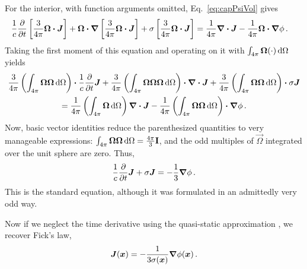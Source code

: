 For the interior, with function arguments omitted, Eq.~\eqref{eq:capPsiVol} gives
\begin{align*}
  \frac{1}{c} \frac{\partial }{\partial t} \left[ \frac{3}{4\pi} \bm{\Omega} \bm{\cdot} \bm{J} \right]
  + \bm{\Omega}\bm{\cdot} \bm{\nabla} \left[ \frac{3}{4\pi} \bm{\Omega} \bm{\cdot} \bm{J} \right]
  + \sigma \left[ \frac{3}{4\pi} \bm{\Omega} \bm{\cdot} \bm{J} \right]
  &= \frac{1}{4\pi} \bm{\nabla} \bm{\cdot}\bm{J}
  - \frac{1}{4\pi} \bm{\Omega}\bm{\cdot} \bm{\nabla} \phi\,.
\end{align*}
Taking the first moment of this equation and operating on it with $\int_{4\pi}
\bm{\Omega}(\cdot) \mathop{}\!\mathrm{d}\Omega$ yields
\begin{multline*}
\frac{3}{4\pi} \left( \int_{4\pi} \bm{\Omega}\bm{\Omega}\mathop{}\!\mathrm{d}\Omega \right) \bm{\cdot}
\frac{1}{c} \frac{\partial }{\partial t} \bm{J}
+ \frac{3}{4\pi} \left( \int_{4\pi}
  \bm{\Omega}\bm{\Omega}\bm{\Omega}\mathop{}\!\mathrm{d}\Omega \right)
\bm{\cdot} \bm{\nabla} \bm{\cdot} \bm{J}
+ \frac{3}{4\pi} \left( \int_{4\pi} \bm{\Omega}\bm{\Omega}\mathop{}\!\mathrm{d}\Omega \right)
\bm{\cdot} \sigma \bm{J}
\\
= \frac{1}{4\pi} \left( \int_{4\pi} \bm{\Omega}\mathop{}\!\mathrm{d}\Omega \right)
\bm{\nabla} \bm{\cdot}\bm{J}
- \frac{1}{4\pi} \left( \int_{4\pi} \bm{\Omega}\bm{\Omega}\mathop{}\!\mathrm{d}\Omega \right)\bm{\cdot} \bm{\nabla} \phi\,.
\end{multline*}
Now, basic vector identities \cite{Lar2007} reduce the parenthesized
quantities to very manageable expressions: $\int_{4\pi}
\bm{\Omega}\bm{\Omega}\mathop{}\!\mathrm{d}\Omega=\frac{4\pi}{3}\mathbf{I}$, and the odd
multiples of $\vec{\Omega}$ integrated over the unit sphere are zero. Thus,
\begin{equation*}
  \frac{1}{c} \frac{\partial }{\partial t} \bm{J}
  + \sigma \bm{J}
  =
  - \frac{1}{3} \bm{\nabla} \phi\,.
\end{equation*}
This is the standard \Pone{} equation, although it was formulated in an
admittedly very odd way.

Now if we neglect the time derivative using the quasi-static approximation
\cite{Dud1976}, we recover Fick's law,
\begin{equation*}
\bm{J}(\bm{x}) = - \frac{1}{3\sigma(\bm{x})} \bm{\nabla} \phi(\bm{x}) \,.
\end{equation*}

